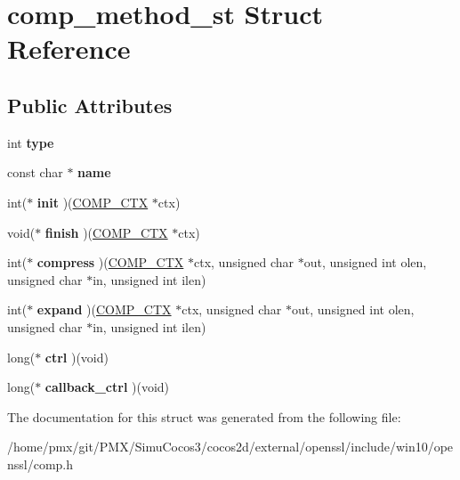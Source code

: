 \hypertarget{structcomp__method__st}{}\section{comp\+\_\+method\+\_\+st Struct Reference}
\label{structcomp__method__st}
\subsection*{Public Attributes}
\begin{DoxyCompactItemize}
\item 
\mbox{\label{structcomp__method__st_a398382b23088b56dc05184016dfe247c}} 
int {\bfseries type}
\item 
\mbox{\label{structcomp__method__st_a2331b9bae2f1539bab8e75efc58283b1}} 
const char $\ast$ {\bfseries name}
\item 
\mbox{\label{structcomp__method__st_af175cb97f5906c4298b88c65507a8a64}} 
int($\ast$ {\bfseries init} )(\hyperlink{structcomp__ctx__st}{C\+O\+M\+P\+\_\+\+C\+TX} $\ast$ctx)
\item 
\mbox{\label{structcomp__method__st_af6a0a033a48d84fad2cfd6776f4c2dfc}} 
void($\ast$ {\bfseries finish} )(\hyperlink{structcomp__ctx__st}{C\+O\+M\+P\+\_\+\+C\+TX} $\ast$ctx)
\item 
\mbox{\label{structcomp__method__st_ad894ddf63c5ec8904fc9ea47d138fbac}} 
int($\ast$ {\bfseries compress} )(\hyperlink{structcomp__ctx__st}{C\+O\+M\+P\+\_\+\+C\+TX} $\ast$ctx, unsigned char $\ast$out, unsigned int olen, unsigned char $\ast$in, unsigned int ilen)
\item 
\mbox{\label{structcomp__method__st_a553b3c0860205e265266e958eba563af}} 
int($\ast$ {\bfseries expand} )(\hyperlink{structcomp__ctx__st}{C\+O\+M\+P\+\_\+\+C\+TX} $\ast$ctx, unsigned char $\ast$out, unsigned int olen, unsigned char $\ast$in, unsigned int ilen)
\item 
\mbox{\label{structcomp__method__st_a1759ea60f1c12ec6d9489855b78b1463}} 
long($\ast$ {\bfseries ctrl} )(void)
\item 
\mbox{\label{structcomp__method__st_a56f1252386d5b98a5560b1ada313ce09}} 
long($\ast$ {\bfseries callback\+\_\+ctrl} )(void)
\end{DoxyCompactItemize}


The documentation for this struct was generated from the following file\+:\begin{DoxyCompactItemize}
\item 
/home/pmx/git/\+P\+M\+X/\+Simu\+Cocos3/cocos2d/external/openssl/include/win10/openssl/comp.\+h\end{DoxyCompactItemize}
